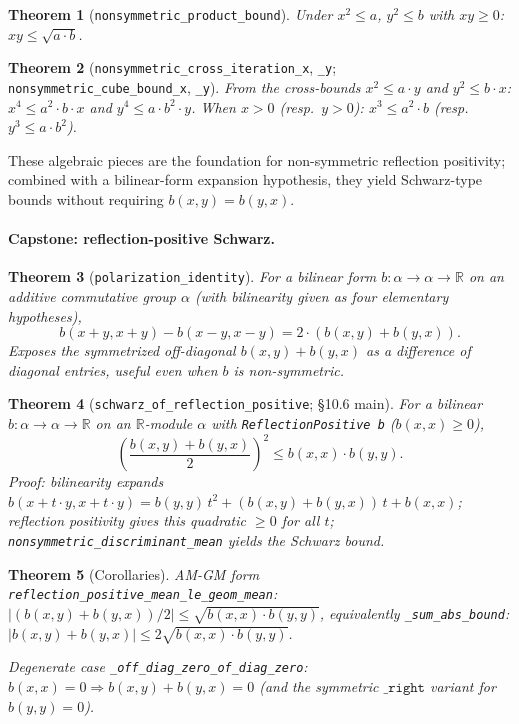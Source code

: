 \documentclass[a4paper,11pt]{article}
\newtheorem{theorem}{Theorem}
\begin{document}
\begin{theorem}[\texttt{nonsymmetric\_product\_bound}]
Under $x^2 \le a$, $y^2 \le b$ with $xy \ge 0$:
$xy \le \sqrt{a \cdot b}$.
\end{theorem}

\begin{theorem}[\texttt{nonsymmetric\_cross\_iteration\_x},
\texttt{\_y}; \texttt{nonsymmetric\_cube\_bound\_x}, \texttt{\_y}]
From the cross-bounds $x^2 \le a \cdot y$ and $y^2 \le b \cdot x$:
$x^4 \le a^2 \cdot b \cdot x$ and $y^4 \le a \cdot b^2 \cdot y$.
When $x > 0$ (resp.\ $y > 0$): $x^3 \le a^2 \cdot b$ (resp.\
$y^3 \le a \cdot b^2$).
\end{theorem}

These algebraic pieces are the foundation for non-symmetric reflection
positivity; combined with a bilinear-form expansion hypothesis, they
yield Schwarz-type bounds without requiring $b(x, y) = b(y, x)$.

\paragraph{Capstone: reflection-positive Schwarz.}

\begin{theorem}[\texttt{polarization\_identity}]
For a bilinear form $b : \alpha \to \alpha \to \mathbb{R}$ on an
additive commutative group $\alpha$ (with bilinearity given as four
elementary hypotheses),
\[
  b(x + y, x + y) - b(x - y, x - y) = 2 \cdot (b(x, y) + b(y, x)).
\]
Exposes the symmetrized off-diagonal $b(x, y) + b(y, x)$ as a difference
of diagonal entries, useful even when $b$ is non-symmetric.
\end{theorem}

\begin{theorem}[\texttt{schwarz\_of\_reflection\_positive}; \S10.6 main]
For a bilinear $b : \alpha \to \alpha \to \mathbb{R}$ on an $\mathbb{R}$-module $\alpha$
with \texttt{ReflectionPositive b} ($b(x, x) \ge 0$),
\[
  \left(\frac{b(x, y) + b(y, x)}{2}\right)^2 \le b(x, x) \cdot b(y, y).
\]
Proof: bilinearity expands
$b(x + t\cdot y, x + t\cdot y) = b(y, y)\,t^2 + (b(x, y) + b(y, x))\,t
+ b(x, x)$;
reflection positivity gives this quadratic $\ge 0$ for all $t$;
\texttt{nonsymmetric\_discriminant\_mean} yields the Schwarz bound.
\end{theorem}

\begin{theorem}[Corollaries]
AM-GM form \texttt{reflection\_positive\_mean\_le\_geom\_mean}:
$|(b(x, y) + b(y, x)) / 2| \le \sqrt{b(x, x) \cdot b(y, y)}$,
equivalently \texttt{\_sum\_abs\_bound}:
$|b(x, y) + b(y, x)| \le 2 \sqrt{b(x, x) \cdot b(y, y)}$.

Degenerate case \texttt{\_off\_diag\_zero\_of\_diag\_zero}:
$b(x, x) = 0 \Rightarrow b(x, y) + b(y, x) = 0$
(and the symmetric $\texttt{\_right}$ variant for $b(y, y) = 0$).
\end{theorem}
\end{document}
